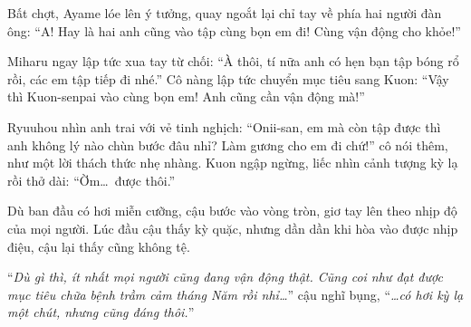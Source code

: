 \documentclass[../main.tex]{subfiles}
\begin{document}
Bất chợt, Ayame lóe lên ý tưởng, quay ngoắt lại chỉ tay về phía hai người đàn ông: ``A! Hay là hai anh cũng vào tập cùng bọn em đi! Cùng vận động cho khỏe!''

Miharu ngay lập tức xua tay từ chối: ``À thôi, tí nữa anh có hẹn bạn tập bóng rổ rồi, các em tập tiếp đi nhé.'' Cô nàng lập tức chuyển mục tiêu sang Kuon: ``Vậy thì Kuon-senpai vào cùng bọn em! Anh cũng cần vận động mà!''

Ryuuhou nhìn anh trai với vẻ tinh nghịch: ``Onii-san, em mà còn tập được thì anh không lý nào chùn bước đâu nhỉ? Làm gương cho em đi chứ!'' cô nói thêm, như một lời thách thức nhẹ nhàng. Kuon ngập ngừng, liếc nhìn cảnh tượng kỳ lạ rồi thở dài: ``Ờm\dots\ được thôi.''

Dù ban đầu có hơi miễn cưỡng, cậu bước vào vòng tròn, giơ tay lên theo nhịp độ của mọi người. Lúc đầu cậu thấy kỳ quặc, nhưng dần dần khi hòa vào được nhịp điệu, cậu lại thấy cũng không tệ.

``\textit{Dù gì thì, ít nhất mọi người cũng đang vận động thật. Cũng coi như đạt được mục tiêu chữa bệnh trầm cảm tháng Năm rồi nhỉ\dots}'' cậu nghĩ bụng, ``\textit{\dots có hơi kỳ lạ một chút, nhưng cũng đáng thôi.}''
\end{document}
